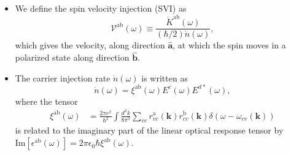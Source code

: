 \documentclass{beamer}
\begin{document}
\begin{frame}

{\small


\begin{itemize}

\item 
We define the spin velocity injection (SVI) as
\begin{equation}\label{eq:vab-w}
\mathcal{V}^{\mathrm{ab}}(\omega) \equiv
\frac{\dot{K}^{\mathrm{ab}}(\omega)}{(\hbar/2) \dot{n}(\omega)},
\end{equation}  
which gives the velocity, along direction $\hat{\mathbf{a}}$, at which the spin
moves in a polarized state along direction $\hat{\mathbf{b}}$. 

\item The carrier injection rate $\dot n(\omega)$ is written as
\begin{equation}
\dot{n}(\omega) =
\xi^{\mathrm{ab}}(\omega) E^{c }(\omega) E^{d*}(\omega)
,
\label{eq:dotn}
\end{equation}
where the tensor 
\begin{equation}\label{eq:xi}
\begin{aligned}
\xi^{\mathrm{ab}}(\omega)
&
=
\frac{2\pi e^{2}}{\hbar^{2}} \int 
\frac{d^{3}k}{8 \pi^{3}}
 \sum_{vc}
r^{\mathrm{a}}_{vc}({\mathbf k})  
r^{\mathrm{b}}_{cv }({\mathbf k})  
\delta(\omega-\omega_{cv}({\mathbf k}))
\end{aligned}
\end{equation}
is related to the imaginary part of the linear optical response tensor by
$\mathrm{Im} [\epsilon^{\mathrm{a}\mathrm{b}}(\omega)] =
2\pi\epsilon_0\hbar\xi^{\mathrm{a}\mathrm{b}}(\omega)$.
\end{itemize}
}
\end{frame}


\end{document}
